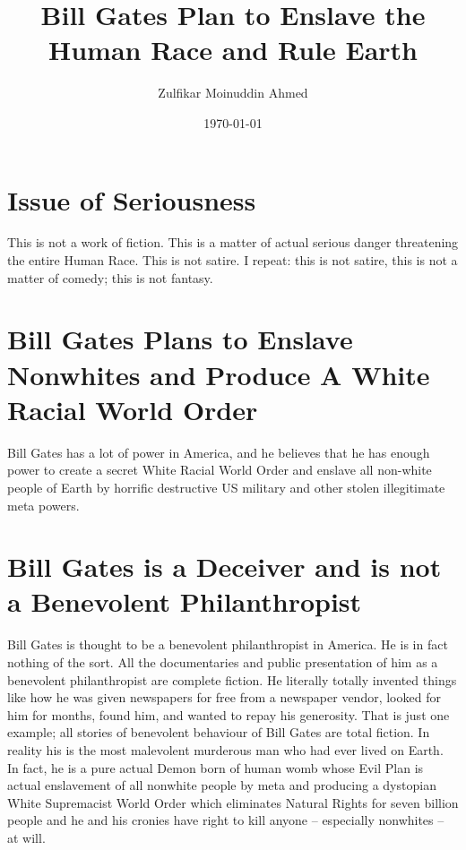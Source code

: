 \documentclass{amsart}
\title{Bill Gates Plan to Enslave the Human Race and Rule Earth}
\author{Zulfikar Moinuddin Ahmed}
\date{\today}
\begin{document}
\maketitle

\section{Issue of Seriousness}

This is not a work of fiction.  This is a matter of actual serious danger threatening the entire Human Race.  This is not satire.  I repeat: this is not satire, this is not a matter of comedy; this is not fantasy.  

\section{Bill Gates Plans to Enslave Nonwhites and Produce A White Racial World Order}

Bill Gates has a lot of power in America, and he believes that he has enough power to create a secret White Racial World Order and enslave all non-white people of Earth by horrific destructive US military and other stolen illegitimate meta powers.  

\section{Bill Gates is a Deceiver and is not a Benevolent Philanthropist}

Bill Gates is thought to be a benevolent philanthropist in America.  He is in fact nothing of the sort.  All the documentaries and  public presentation of him as a benevolent philanthropist are complete fiction.  He literally totally invented things like how he was given newspapers for free from a newspaper vendor, looked for him for months, found him, and wanted to repay his generosity. That is just one example; all stories of benevolent behaviour of Bill Gates are total fiction.  In reality his is the most malevolent murderous man who had ever lived on Earth.  In fact, he is a pure actual Demon born of human womb whose Evil Plan is actual enslavement of all nonwhite people by meta and producing a dystopian White Supremacist World Order which eliminates Natural Rights for seven billion people and he and his cronies have right to kill anyone -- especially nonwhites -- at will.
\end{document}
